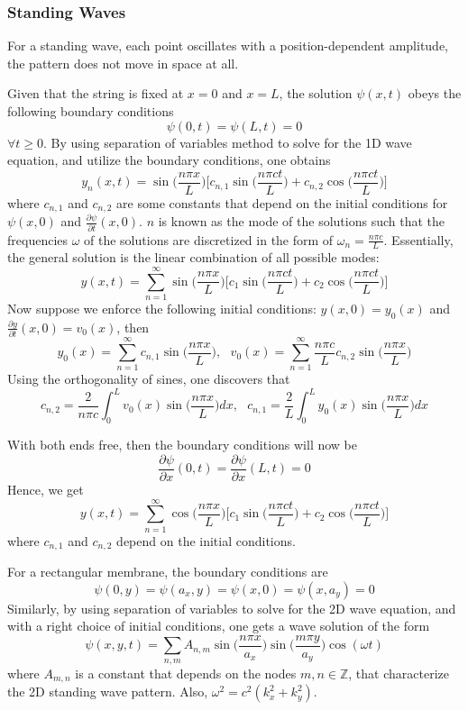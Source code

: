 \documentclass[a4paper]{article}
\begin{document}
\subsubsection*{Standing Waves}
\begin{defi}
For a standing wave, each point oscillates with
a position-dependent amplitude, the pattern does not move in space at all.
\end{defi}
\begin{eg}
Given that the string is fixed at $x=0$ and $x=L$, the solution $\psi(x,t)$ obeys the following boundary conditions
$$\psi(0,t)=\psi(L,t)=0$$
$\forall t\geq0$. By using separation of variables method to solve for the 1D wave equation, and utilize the boundary conditions, one obtains
$$y_n(x,t)=\sin\bigg(\frac{n\pi x}{L}\bigg)\bigg[c_{n,1}\sin\bigg(\frac{n\pi ct}{L}\bigg)+c_{n,2}\cos\bigg(\frac{n\pi ct}{L}\bigg)\bigg]$$
where $c_{n,1}$ and $c_{n,2}$ are some constants that depend on the initial conditions for $\psi(x,0)$ and $\frac{\partial\psi}{\partial t}(x,0)$. $n$ is known as the mode of the solutions such that the frequencies $\omega$ of the solutions are discretized in the form of $\omega_n=\frac{n\pi c}{L}$. Essentially, the general solution is the linear combination of all possible modes:
$$y(x,t)=\sum_{n=1}^\infty\sin\bigg(\frac{n\pi x}{L}\bigg)\bigg[c_1\sin\bigg(\frac{n\pi ct}{L}\bigg)+c_2\cos\bigg(\frac{n\pi ct}{L}\bigg)\bigg]$$
Now suppose we enforce the following initial conditions: $y(x,0)=y_0(x)$ and $\frac{\partial y}{\partial t}(x,0)=v_0(x)$, then 
$$y_0(x)=\sum_{n=1}^\infty c_{n,1}\sin\bigg(\frac{n\pi x}{L}\bigg),\text{  }v_0(x)=\sum_{n=1}^\infty\frac{n\pi c}{L} c_{n,2}\sin\bigg(\frac{n\pi x}{L}\bigg)$$
Using the orthogonality of sines, one discovers that
$$c_{n,2}=\frac{2}{n\pi c}\int_0^Lv_0(x)\sin\bigg(\frac{n\pi x}{L}\bigg)dx,\text{  }c_{n,1}=\frac{2}{L}\int_0^Ly_0(x)\sin\bigg(\frac{n\pi x}{L}\bigg)dx$$
\end{eg}
\begin{eg}
With both ends free, then the boundary conditions will now be
$$\frac{\partial\psi}{\partial x}(0,t)=\frac{\partial\psi}{\partial x}(L,t)=0$$
Hence, we get
$$y(x,t)=\sum_{n=1}^\infty\cos\bigg(\frac{n\pi x}{L}\bigg)\bigg[c_1\sin\bigg(\frac{n\pi ct}{L}\bigg)+c_2\cos\bigg(\frac{n\pi ct}{L}\bigg)\bigg]$$
where $c_{n,1}$ and $c_{n,2}$ depend on the initial conditions.
\end{eg}
\begin{eg}
For a rectangular membrane, the boundary conditions are
$$\psi(0,y)=\psi(a_x,y)=\psi(x,0)=\psi(x,a_y)=0$$
Similarly, by using separation of variables to solve for the 2D wave equation, and with a right choice of initial conditions, one gets a wave solution of the form
$$\psi(x,y,t)=\sum_{n,m}A_{n,m}\sin\bigg(\frac{n\pi x}{a_x}\bigg)\sin\bigg(\frac{m\pi y}{a_y}\bigg)\cos(\omega t)$$
where $A_{m,n}$ is a constant that depends on the nodes $m,n\in\mathbb{Z}$, that characterize the 2D standing wave pattern. Also, $\omega^2=c^2(k_x^2+k_y^2)$.
\end{eg}
\end{document}
